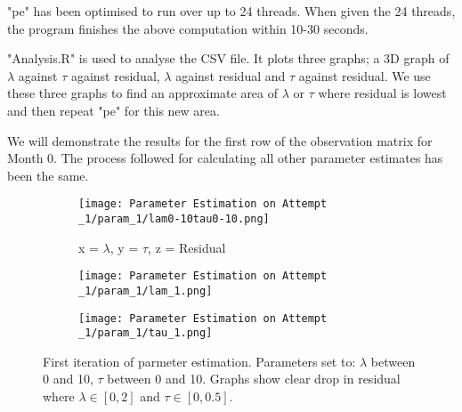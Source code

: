     "pe" has been optimised to run over up to 24 threads. When given the 24 threads,  the program finishes the above computation within 10-30 seconds.


    "Analysis.R" is used to analyse the CSV file. It plots three graphs; a 3D graph of $\lambda$ against $\tau$ against residual, $\lambda$ against residual and $\tau$ against residual. We use these three graphs to find an approximate area of $\lambda$ or $\tau$ where residual is lowest and then repeat "pe" for this new area. 

    We will demonstrate the results for the first row of the observation matrix for Month 0. The process followed for calculating all other parameter estimates has been the same. 

    \begin{figure}
        \begin{subfigure}{.8\textwidth}
        \centering
        \texttt{[image: Parameter Estimation on Attempt \_1/param\_1/lam0-10tau0-10.png]}
        \caption{x = $\lambda$, y = $\tau$, z = Residual}
        \label{pe1:1}
        \end{subfigure}

        \begin{subfigure}{.45\textwidth}
        \centering
        \texttt{[image: Parameter Estimation on Attempt \_1/param\_1/lam\_1.png]}
        \caption{}
        \label{pe1:2}
        \end{subfigure}
        \begin{subfigure}{.45\textwidth}
        \centering
        \texttt{[image: Parameter Estimation on Attempt \_1/param\_1/tau\_1.png]}
        \caption{}
        \label{pe1:3}
        \end{subfigure}
        \caption{First iteration of parmeter estimation. Parameters set to: $\lambda$ between 0 and 10, $\tau$ between 0 and 10. Graphs show clear drop in residual where $\lambda \in [0,2]$ and $\tau \in [0,0.5]$.}
        \label{pe1}
    \end{figure}

